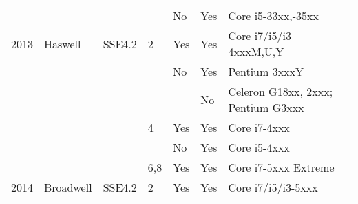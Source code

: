 \begin{longtable}{lllllll}
     &              &             &       & No  & Yes    & Core i5-33xx,-35xx                               \\
2013 & Haswell      & SSE4.2      & 2     & Yes & Yes    & Core i7/i5/i3 4xxxM,U,Y                          \\
     &              &             &       & No  & Yes    & Pentium 3xxxY                                    \\
     &              &             &       &     & No     & Celeron G18xx, 2xxx; Pentium G3xxx               \\
     &              &             & 4     & Yes & Yes    & Core i7-4xxx                                     \\
     &              &             &       & No  & Yes    & Core i5-4xxx                                     \\
     &              &             & 6,8   & Yes & Yes    & Core i7-5xxx Extreme                             \\
2014 & Broadwell    & SSE4.2      & 2     & Yes & Yes    & Core i7/i5/i3-5xxx                              
\end{longtable}